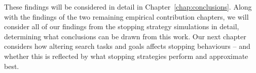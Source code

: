 These findings will be considered in detail in Chapter~\ref{chap:conclusions}. Along with the findings of the two remaining empirical contribution chapters, we will consider all of our findings from the stopping strategy simulations in detail, determining what conclusions can be drawn from this work. Our next chapter considers how altering search tasks and goals affects stopping behaviours -- and whether this is reflected by what stopping strategies perform and approximate best.

\newpage
\thispagestyle{empty}
\mbox{}